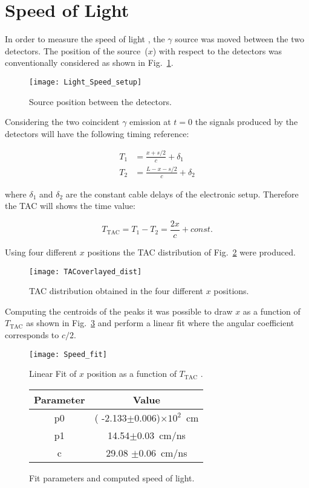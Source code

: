 \section*{Speed of Light}
In order to measure the speed of light , the $\gamma$ source was moved between the two detectors. The position of the source~($x$) with respect to the detectors was conventionally considered as shown in Fig.~\ref{Fig:Src_pos}.
\begin{figure}[h!]
	\centering
	\texttt{[image: Light\_Speed\_setup]}
	\caption{Source position between the detectors.}
	\label{Fig:Src_pos}
\end{figure}

Considering the two coincident $\gamma$ emission at $t=0$ the signals produced by the detectors will have the following timing reference:

\[
\begin{aligned}
T_1 &=\frac{x+s/2}{c}+\delta_1\\
T_2 &=\frac{L-x-s/2}{c}+\delta_2
\end{aligned}
\]

where $\delta_1$ and $\delta_2$ are the constant cable delays of the electronic setup.  Therefore the TAC will shows the time value:

\[
T_{\text{TAC}}=T_1-T_2=\frac{2 x}{c}+const.
\] 

Using four different $x$ positions the  TAC distribution of Fig.~\ref{Fig:TAC_speed_dist} were produced.

\begin{figure}[h]
	\centering
	\texttt{[image: TACoverlayed\_dist]}
	\caption{TAC distribution obtained in the four different $x$ positions.}
	\label{Fig:TAC_speed_dist}
\end{figure}

Computing the centroids of the peaks it was possible to draw $x$ as a function of $T_{\text{TAC}}$ as shown in Fig.~\ref{Fig:Speed_fit} and perform a linear fit where the angular coefficient corresponds to $c/2$.
 
 \begin{figure}[H]
 	\begin{minipage}[b]{0.6\textwidth}
\centering
\texttt{[image: Speed\_fit]}
\caption{Linear Fit of $x$ position as a function of $T_{\text{TAC}}$ .}
\label{Fig:Speed_fit}
 	\end{minipage}
 	\hfill
 	\begin{minipage}[b]{0.45\textwidth}
 		\centering
 		\begin{tabular}{cc}
 			\toprule
 			\toprule
 			Parameter & Value \\
 			\midrule
 			p0     & ( -2.133$\pm$0.006)$\times 10^2$~cm \\
 			p1     & 14.54$\pm$0.03~cm/ns\\
 			c        & 29.08 $\pm$0.06~cm/ns\\
 			\bottomrule
 			\bottomrule
 		\end{tabular}
 		\vspace{1.45cm}
 		\caption*{Fit parameters and computed speed of light.}
 	\end{minipage}
 \end{figure}

